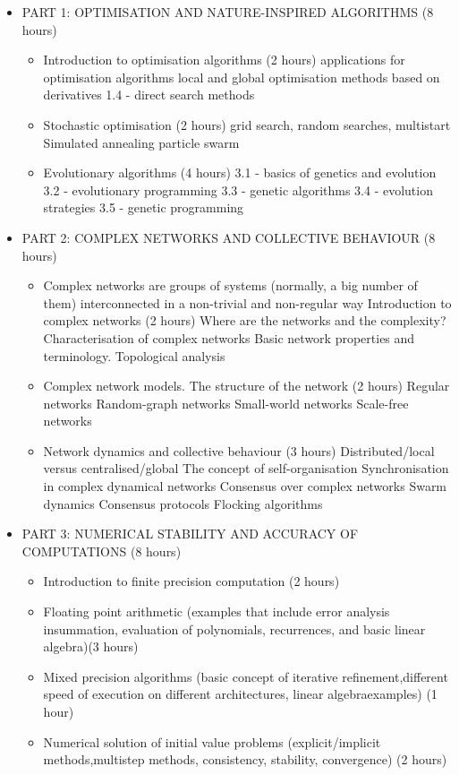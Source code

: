 \begin{mymulticols}
  \begin{itemize}
  \item PART 1: OPTIMISATION AND NATURE-INSPIRED ALGORITHMS (8 hours)
    \begin{itemize}
      \item Introduction to optimisation algorithms (2 hours)
	applications for optimisation algorithms
	local and global optimisation
	methods based on derivatives
	1.4 - direct search methods
      \item Stochastic optimisation (2 hours)
	grid search, random searches, multistart
	Simulated annealing
	particle swarm
      \item Evolutionary algorithms (4 hours)
	3.1 - basics of genetics and evolution
	3.2 - evolutionary programming
	3.3 - genetic algorithms
	3.4 - evolution strategies
	3.5 - genetic programming
        \end{itemize}
  \item PART 2: COMPLEX NETWORKS AND COLLECTIVE BEHAVIOUR (8 hours)
    \begin{itemize}
      \item Complex networks are groups of systems (normally, a big number of them) interconnected in a non-trivial and non-regular way
Introduction to complex networks (2 hours)
	Where are the networks and the complexity?
	Characterisation of complex networks
	Basic network properties and terminology. Topological analysis
      \item Complex network models. The structure of the network (2 hours)
	Regular networks
	Random-graph networks
	Small-world networks
	Scale-free networks
      \item Network dynamics and collective behaviour (3 hours)
	Distributed/local versus centralised/global
	The concept of self-organisation
	Synchronisation in complex dynamical networks
	Consensus over complex networks
	Swarm dynamics
	Consensus protocols
	Flocking algorithms
        \end{itemize}
  \item PART 3: NUMERICAL STABILITY AND ACCURACY OF COMPUTATIONS (8 hours)
    \begin{itemize}
      \item Introduction to finite precision computation (2 hours)
      \item Floating point arithmetic (examples that include error analysis insummation, evaluation of polynomials, recurrences, and basic linear algebra)(3 hours)
      \item Mixed precision algorithms (basic concept of iterative refinement,different speed of execution on different architectures, linear algebraexamples) (1 hour)
      \item Numerical solution of initial value problems (explicit/implicit methods,multistep methods, consistency, stability, convergence) (2 hours)
    \end{itemize}
  \end{itemize}

\end{mymulticols}

